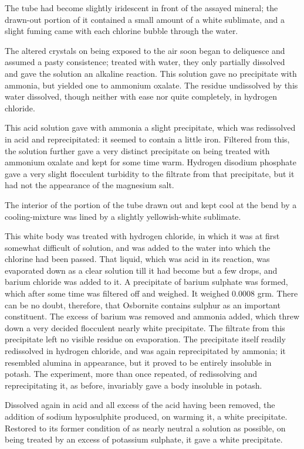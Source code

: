 \documentclass[a4paper, 12pt, oneside]{article}
\begin{document}
The tube had become slightly iridescent in front of the assayed mineral; the drawn-out portion of it contained a small amount of a white sublimate, and a slight fuming came with each chlorine bubble through the water.

The altered crystals on being exposed to the air soon began to deliquesce and assumed a pasty consistence; treated with water, they only partially dissolved and gave the solution an alkaline reaction. This solution gave no precipitate with ammonia, but yielded one to ammonium oxalate. The residue undissolved by this water dissolved, though neither with ease nor quite completely, in hydrogen chloride.

This acid solution gave with ammonia a slight precipitate, which was redissolved in acid and reprecipitated: it seemed to contain a little iron. Filtered from this, the solution further gave a very distinct precipitate on being treated with ammonium oxalate and kept for some time warm. Hydrogen disodium phosphate gave a very slight flocculent turbidity to the filtrate from that precipitate, but it had not the appearance of the magnesium salt.

The interior of the portion of the tube drawn out and kept cool at the bend by a cooling-mixture was lined by a slightly yellowish-white sublimate.

This white body was treated with hydrogen chloride, in which it was at first somewhat difficult of solution, and was added to the water into which the chlorine had been passed. That liquid, which was acid in its reaction, was evaporated down as a clear solution till it had become but a few drops, and barium chloride was added to it. A precipitate of barium sulphate was formed, which after some time was filtered off and weighed. It weighed 0.0008 grm. There can be no doubt, therefore, that Osbornite contains sulphur as an important constituent. The excess of barium was removed and ammonia added, which threw down a very decided flocculent nearly white precipitate. The filtrate from this precipitate left no visible residue on evaporation. The precipitate itself readily redissolved in hydrogen chloride, and was again reprecipitated by ammonia; it resembled alumina in appearance, but it proved to be entirely insoluble in potash. The experiment, more than once repeated, of redissolving and reprecipitating it, as before, invariably gave a body insoluble in potash.

Dissolved again in acid and all excess of the acid having been removed, the addition of sodium hyposulphite produced, on warming it, a white precipitate. Restored to its former condition of as nearly neutral a solution as possible, on being treated by an excess of potassium sulphate, it gave a white precipitate.
\end{document}

